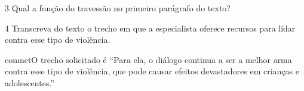 
\num{3} Qual a função do travessão no primeiro parágrafo do texto?


\num{4} Transcreva do texto o trecho em que a especialista oferece recursos
para lidar contra esse tipo de violência. 

comnet{O trecho solicitado é ``Para ela, o diálogo continua a ser a melhor
arma contra esse tipo de violência, que pode causar efeitos devastadores em
crianças e adolescentes.''}


